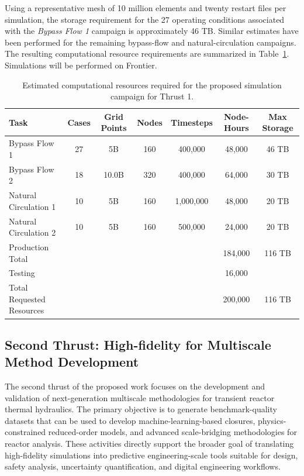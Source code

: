 Using a representative mesh of 10 million elements and twenty restart files per simulation, the storage requirement for the 27 operating conditions associated with the \emph{Bypass Flow 1} campaign is approximately 46 TB. Similar estimates have been performed for the remaining bypass-flow and natural-circulation campaigns. The resulting computational resource requirements are summarized in Table~\ref{tab:resources}. Simulations will be performed on Frontier.

\begin{table}[htbp]
\centering
\caption{Estimated computational resources required for the proposed simulation campaign for Thrust 1. }
\label{tab:resources}
\begin{tabular}{lcccccc}
\hline
Task & Cases & Grid Points & Nodes & Timesteps &
Node-Hours & Max Storage \\
\hline
Bypass Flow 1          & 27 & 5B & 160  & 400,000   & 48,000 & 46 TB \\
Bypass Flow 2          & 18  & 10.0B & 320 & 400,000   & 64,000 & 30 TB \\
Natural Circulation 1  & 10 & 5B & 160  & 1,000,000 & 48,000 & 20 TB \\
Natural Circulation 2  & 10 & 5B & 160  & 500,000   & 24,000 & 20 TB \\
\hline
Production Total & & & & & 184,000 & 116 TB \\
Testing & & & & & 16,000 &  \\
\hline
Total Requested Resources & & & & & 200,000 & 116 TB \\
\hline
\end{tabular}
\end{table}



\subsection*{Second Thrust: High-fidelity for Multiscale Method Development}

The second thrust of the proposed work focuses on the development and validation of next-generation multiscale methodologies for transient reactor thermal hydraulics. The primary objective is to generate benchmark-quality datasets that can be used to develop machine-learning-based closures, physics-constrained reduced-order models, and advanced scale-bridging methodologies for reactor analysis. These activities directly support the broader goal of translating high-fidelity simulations into predictive engineering-scale tools suitable for design, safety analysis, uncertainty quantification, and digital engineering workflows.

